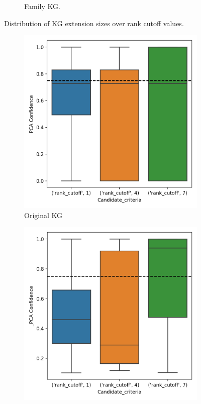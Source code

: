 \begin{figure}[h]
\begin{subfigure}{.5\textwidth}
  \caption{Family KG.}
  \label{fig:rank_extension_family_boxplot_sub}
\end{subfigure}
\caption{Distribution of KG extension sizes over rank cutoff values.}
\label{fig:rank_extensions_boxplot}
\end{figure}

\begin{figure}[h]
\centering
\begin{subfigure}{.5\textwidth}
  \centering
  \includegraphics[width=1\linewidth]{figures/results/ranks/PCA-rank_wn18rr.png}
  \caption{Original KG}
  \label{fig:PCA-rank_wn18rr_boxplot_sub}
\end{subfigure}%
\begin{subfigure}{.5\textwidth}
  \centering
  \includegraphics[width=1\linewidth]{figures/results/ranks/_PCA-rank_wn18rr.png}

\end{subfigure}
\end{figure}

